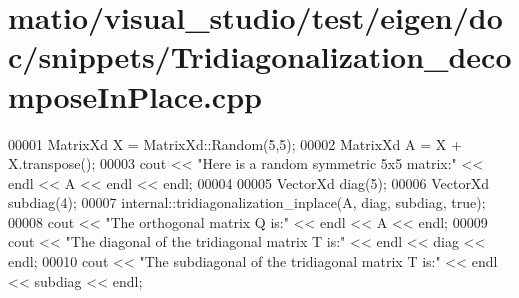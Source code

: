\hypertarget{matio_2visual__studio_2test_2eigen_2doc_2snippets_2_tridiagonalization__decompose_in_place_8cpp_source}{}\section{matio/visual\+\_\+studio/test/eigen/doc/snippets/\+Tridiagonalization\+\_\+decompose\+In\+Place.cpp}
\label{matio_2visual__studio_2test_2eigen_2doc_2snippets_2_tridiagonalization__decompose_in_place_8cpp_source}

\begin{DoxyCode}
00001 MatrixXd X = MatrixXd::Random(5,5);
00002 MatrixXd A = X + X.transpose();
00003 cout << \textcolor{stringliteral}{"Here is a random symmetric 5x5 matrix:"} << endl << A << endl << endl;
00004 
00005 VectorXd diag(5);
00006 VectorXd subdiag(4);
00007 internal::tridiagonalization\_inplace(A, diag, subdiag, \textcolor{keyword}{true});
00008 cout << \textcolor{stringliteral}{"The orthogonal matrix Q is:"} << endl << A << endl;
00009 cout << \textcolor{stringliteral}{"The diagonal of the tridiagonal matrix T is:"} << endl << diag << endl;
00010 cout << \textcolor{stringliteral}{"The subdiagonal of the tridiagonal matrix T is:"} << endl << subdiag << endl;
\end{DoxyCode}

